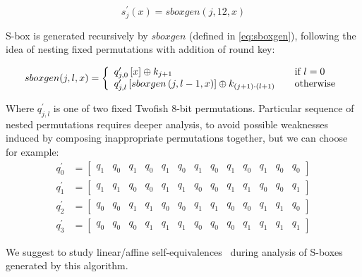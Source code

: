 \documentclass[11pt,oneside,final]{fithesis2}
\begin{document}
    \begin{equation}\label{eq:complex_sbox}
	s^{\prime}_{j}\left(x\right) = sboxgen(j,12,x)
    \end{equation}
    
    S-box is generated recursively by $sboxgen$ (defined in \ref{eq:sboxgen}), following the idea of nesting fixed permutations with addition of round key:
    
    \begin{equation}\label{eq:sboxgen}
	sboxgen(j,l,x) = \left\{ 
	\begin{array}{l l}  
	    q^{\prime}_{j,0}\left[ x \right]                          \oplus k_{j+1}		            & \quad \text{if $l=0$}\\
	    q^{\prime}_{j,l}\left[sboxgen\left(j, l-1,x\right)\right] \oplus k_{(j+1) \cdot (l+1)}          & \quad \text{otherwise}
	\end{array} \right.
    \end{equation}
    
    Where $q^{\prime}_{j,l}$ is one of two fixed Twofish 8-bit permutations. Particular sequence of nested permutations requires deeper analysis, to avoid possible weaknesses 
    induced by composing inappropriate permutations together, but we can choose for example:
    \setcounter{MaxMatrixCols}{13}
    \begin{subequations}
    \begin{align}
	q^{\prime}_{0} &= \begin{bmatrix}  q_1 & q_0 & q_1 & q_0 & q_1 & q_0 & q_1 & q_0 & q_1 & q_0 & q_1 & q_0 & q_0 \end{bmatrix}\\
	q^{\prime}_{1} &= \begin{bmatrix}  q_1 & q_1 & q_0 & q_0 & q_1 & q_1 & q_0 & q_0 & q_1 & q_1 & q_0 & q_0 & q_1 \end{bmatrix}\\
	q^{\prime}_{2} &= \begin{bmatrix}  q_0 & q_0 & q_1 & q_1 & q_0 & q_0 & q_1 & q_1 & q_0 & q_0 & q_1 & q_1 & q_0 \end{bmatrix}\\
	q^{\prime}_{3} &= \begin{bmatrix}  q_0 & q_0 & q_0 & q_1 & q_1 & q_1 & q_0 & q_0 & q_0 & q_1 & q_1 & q_1 & q_1 \end{bmatrix}
    \end{align}
    \end{subequations}

    We suggest to study linear/affine self-equivalences~\citep{Biryukov:2003:TCL:1766171.1766175} during analysis of S-boxes generated by this algorithm.
\end{document}
